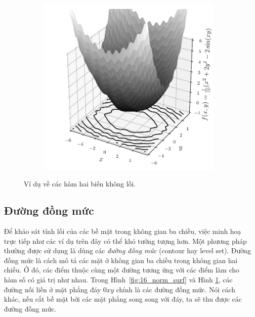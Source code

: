 \begin{figure}[t]
\begin{subfigure}{0.48\textwidth}
\includegraphics[width=0.95\linewidth]{ebookML_src/src/convexity/nonconvex_surface.pdf}
\end{subfigure}
\caption{Ví dụ về các hàm hai biến không lồi. }
\label{fig:16_nonconvexsurface}
\end{figure}

\subsection{Đường đồng mức}
Để khảo sát tính lồi của các bề mặt trong không gian ba chiều, việc minh hoạ
trực tiếp như các ví dụ trên đây có thể khó tưởng tượng hơn. Một phương pháp
thường được sử dụng là dùng các \textit{đường đồng mức} ({contour} hay
{level set}). Đường đồng mức là cách mô tả các mặt ở không gian ba chiều
trong không gian hai chiều. Ở đó, các điểm thuộc cùng một {đường} tương
ứng với các điểm làm cho hàm số có giá trị như nhau. Trong Hình~\ref{fig:16_norm_surf} và Hình
\ref{fig:16_nonconvexsurface}, các đường nối liền ở mặt phẳng đáy $0xy$
chính là các đường đồng mức. Nói cách khác, nếu cắt bề mặt bởi các mặt phẳng song song với đáy, ta sẽ thu được các đường đồng mức.

